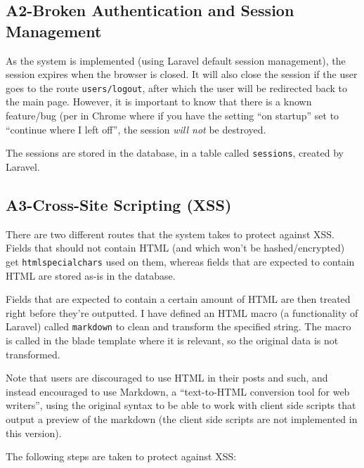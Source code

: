 \subsection{A2-Broken Authentication and Session Management}
\noindent
As the system is implemented (using Laravel default session management), the session expires when the browser is closed. It will also close the session if the user goes to the route \texttt{users/logout}, after which the user will be redirected back to the main page. However, it is important to know that there is a known feature/bug (per \citep{Google2013cwili} in Chrome where if you have the  setting ``on startup'' set to ``continue where I left off'', the session \emph{will not} be destroyed.

The sessions are stored in the database, in a table called \texttt{sessions}, created by Laravel.

\subsection{A3-Cross-Site Scripting (XSS)}
\noindent
There are two different routes that the system takes to protect against XSS. Fields that should not contain HTML (and which won't be hashed/encrypted) get \texttt{htmlspecialchars} used on them, whereas fields that are expected to contain HTML are stored as-is in the database.

Fields that are expected to contain a certain amount of HTML are then treated right before they're outputted. I have defined an HTML macro (a functionality of Laravel) called \texttt{markdown} to clean and transform the specified string. The macro is called in the blade
template where it is relevant, so the original data is not transformed.

Note that users are discouraged to use HTML in their posts and such, and instead encouraged to use Markdown, a ``text-to-HTML conversion tool for web writers''\citep{Markdown2013}, using the original syntax to be able to work with client side scripts that output a preview of the markdown (the client side scripts are not implemented in this version).

The following steps are taken to protect against XSS:

